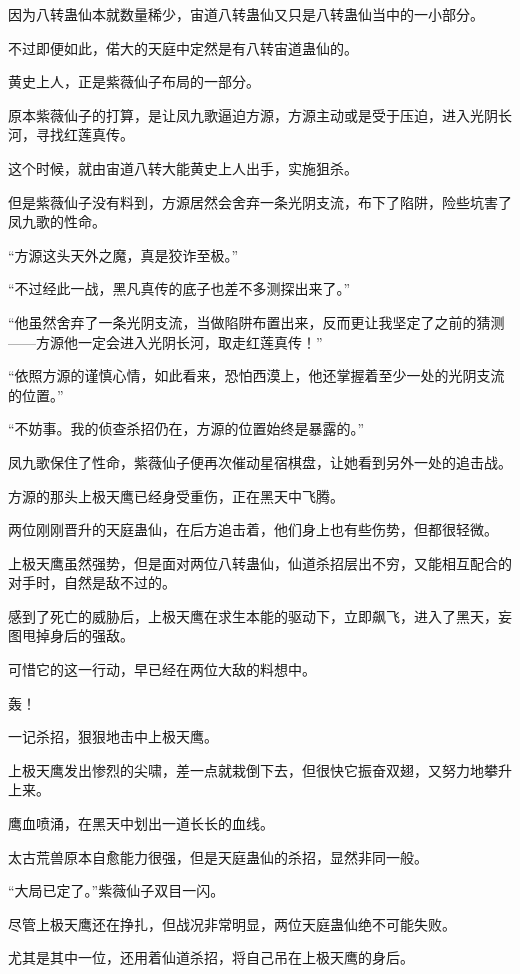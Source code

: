 \begin{this_body}
因为八转蛊仙本就数量稀少，宙道八转蛊仙又只是八转蛊仙当中的一小部分。

不过即便如此，偌大的天庭中定然是有八转宙道蛊仙的。

黄史上人，正是紫薇仙子布局的一部分。

原本紫薇仙子的打算，是让凤九歌逼迫方源，方源主动或是受于压迫，进入光阴长河，寻找红莲真传。

这个时候，就由宙道八转大能黄史上人出手，实施狙杀。

但是紫薇仙子没有料到，方源居然会舍弃一条光阴支流，布下了陷阱，险些坑害了凤九歌的性命。

“方源这头天外之魔，真是狡诈至极。”

“不过经此一战，黑凡真传的底子也差不多测探出来了。”

“他虽然舍弃了一条光阴支流，当做陷阱布置出来，反而更让我坚定了之前的猜测——方源他一定会进入光阴长河，取走红莲真传！”

“依照方源的谨慎心情，如此看来，恐怕西漠上，他还掌握着至少一处的光阴支流的位置。”

“不妨事。我的侦查杀招仍在，方源的位置始终是暴露的。”

凤九歌保住了性命，紫薇仙子便再次催动星宿棋盘，让她看到另外一处的追击战。

方源的那头上极天鹰已经身受重伤，正在黑天中飞腾。

两位刚刚晋升的天庭蛊仙，在后方追击着，他们身上也有些伤势，但都很轻微。

上极天鹰虽然强势，但是面对两位八转蛊仙，仙道杀招层出不穷，又能相互配合的对手时，自然是敌不过的。

感到了死亡的威胁后，上极天鹰在求生本能的驱动下，立即飙飞，进入了黑天，妄图甩掉身后的强敌。

可惜它的这一行动，早已经在两位大敌的料想中。

轰！

一记杀招，狠狠地击中上极天鹰。

上极天鹰发出惨烈的尖啸，差一点就栽倒下去，但很快它振奋双翅，又努力地攀升上来。

鹰血喷涌，在黑天中划出一道长长的血线。

太古荒兽原本自愈能力很强，但是天庭蛊仙的杀招，显然非同一般。

“大局已定了。”紫薇仙子双目一闪。

尽管上极天鹰还在挣扎，但战况非常明显，两位天庭蛊仙绝不可能失败。

尤其是其中一位，还用着仙道杀招，将自己吊在上极天鹰的身后。


\end{this_body}
